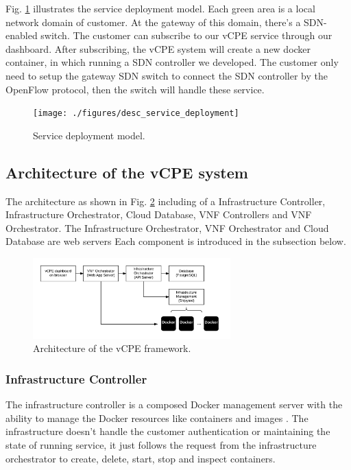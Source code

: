 \documentclass[journal]{IEEEtran}
\begin{document}
Fig. \ref{fig:desc_service_deployment} illustrates the service deployment model. Each green area is a local network domain of customer. At the gateway of this domain, there’s a SDN-enabled switch. The customer can subscribe to our vCPE service through our dashboard. After subscribing, the vCPE system will create a new docker container, in which running a SDN controller we developed. The customer only need to setup the gateway SDN switch to connect the SDN controller by the OpenFlow protocol, then the switch will handle these service.

\begin{figure}[!t]
\centering
\texttt{[image: ./figures/desc\_service\_deployment]}
\caption{Service deployment model.}
\label{fig:desc_service_deployment}
\end{figure}



\subsection{Architecture of the vCPE system}
The architecture as shown in Fig. \ref{fig:desc_vcpe_framework} including of a Infrastructure Controller, Infrastructure Orchestrator, Cloud Database, VNF Controllers and VNF Orchestrator.
The Infrastructure Orchestrator, VNF Orchestrator and Cloud Database are web servers
Each component is introduced in the subsection below.

\begin{figure}[!t]
\centering
\includegraphics[width=3in]{./figures/desc_vcpe_framework}
\caption{Architecture of the vCPE framework.}
\label{fig:desc_vcpe_framework}
\end{figure}

\subsubsection{Infrastructure Controller}

The infrastructure controller is a composed Docker management server with the ability to manage the Docker resources like containers and images \cite{seo2014}\cite{compare-vm-container}. The infrastructure doesn't handle the customer authentication or maintaining the state of running service, it just follows the request from the infrastructure orchestrator to create, delete, start, stop and inspect containers.
\end{document}
